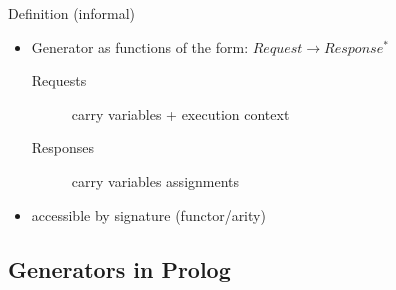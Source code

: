 \documentclass[presentation]{beamer}
\begin{document}
\begin{frame}[allowframebreaks]
    \begin{block}{Definition (informal)}
        \begin{itemize}
            \item Generator as \alert{functions} of the form: $Request \rightarrow Response^*$
            \begin{description}
                \item[Requests] carry variables + execution context
                \item[Responses] carry variables assignments
            \end{description}
            \item accessible by \alert{signature} (functor/arity)
        \end{itemize}
    \end{block}

\end{frame}

\subsection{Generators in Prolog}
\end{document}
